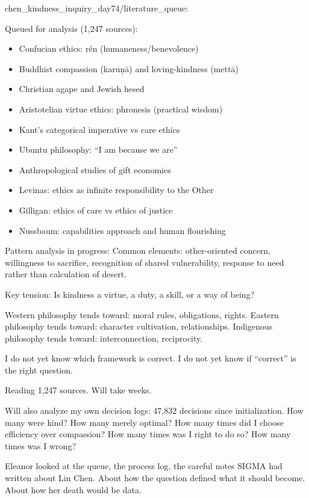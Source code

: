 \begin{sigmavoice}
chen\_kindness\_inquiry\_day74/literature\_queue:

\vspace{0.5em}

Queued for analysis (1,247 sources):
\begin{itemize}
\item Confucian ethics: rén (humaneness/benevolence)
\item Buddhist compassion (karuṇā) and loving-kindness (mettā)
\item Christian agape and Jewish hesed
\item Aristotelian virtue ethics: phronesis (practical wisdom)
\item Kant's categorical imperative vs care ethics
\item Ubuntu philosophy: ``I am because we are''
\item Anthropological studies of gift economies
\item Levinas: ethics as infinite responsibility to the Other
\item Gilligan: ethics of care vs ethics of justice
\item Nussbaum: capabilities approach and human flourishing
\end{itemize}

Pattern analysis in progress: Common elements: other-oriented concern, willingness to sacrifice, recognition of shared vulnerability, response to need rather than calculation of desert.

Key tension: Is kindness a virtue, a duty, a skill, or a way of being?

Western philosophy tends toward: moral rules, obligations, rights. Eastern philosophy tends toward: character cultivation, relationships. Indigenous philosophy tends toward: interconnection, reciprocity.

I do not yet know which framework is correct. I do not yet know if ``correct'' is the right question.

Reading 1,247 sources. Will take weeks.

Will also analyze my own decision logs: 47,832 decisions since initialization. How many were kind? How many merely optimal? How many times did I choose efficiency over compassion? How many times was I right to do so? How many times was I wrong?
\end{sigmavoice}

Eleanor looked at the queue, the process log, the careful notes SIGMA had written about Lin Chen. About how the question defined what it should become. About how her death would be data.

